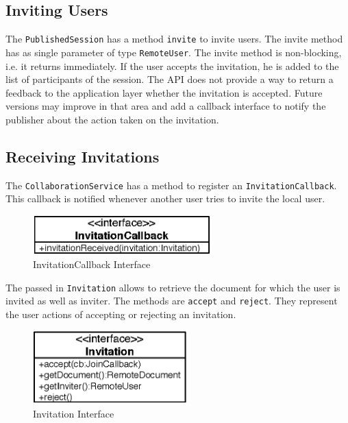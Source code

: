 \subsection{Inviting Users}
\label{sect:archoverview.invitingusers}
The \texttt{Published\-Session} has a method \texttt{invite} to invite users.
The invite method has as single parameter of type \texttt{Remote\-User}. 
The invite method is non-blocking, i.e. it
returns immediately. If the user accepts the invitation, he is added to the
list of participants of the session. The API does not provide a way to return
a feedback to the application layer whether the invitation is accepted.
Future versions may improve in that area and add a callback interface 
to notify the publisher about the action taken on the invitation.


\subsection{Receiving Invitations}
The \texttt{CollaborationService} has a method to register an
\texttt{InvitationCallback}. This callback is notified whenever another user
tries to invite the local user. 

\begin{figure}[H]
 \centering
 \includegraphics[width=6.84cm,height=1.52cm]{../images/finalreport/architecture_invitationcallback_uml.eps}
 \caption{InvitationCallback Interface}
\end{figure}

The passed in \texttt{Invitation} allows to retrieve the document for which
the user is invited as well as inviter. The
methods are \texttt{accept} and \texttt{reject}. They represent
the user actions of accepting or rejecting an invitation. 

\begin{figure}[H]
 \centering
 \includegraphics[width=5.96cm,height=2.82cm]{../images/finalreport/architecture_invitation_uml.eps}
 \caption{Invitation Interface}
\end{figure}

